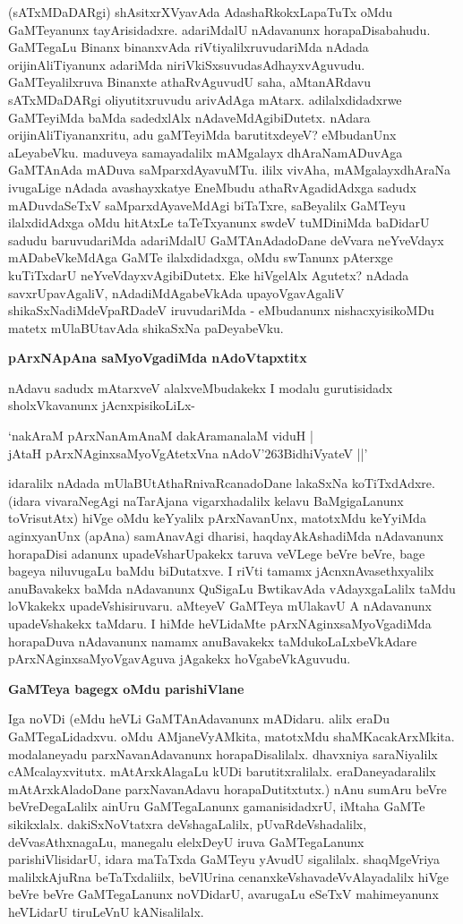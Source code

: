 (sATxMDaDARgi) shAsitxrXVyavAda AdashaRkokxLapaTuTx oMdu GaMTeyanunx tayArisidadxre. adariMdalU nAdavanunx horapaDisabahudu. GaMTegaLu Binanx binanxvAda riVtiyalilxruvudariMda nAdada orijinAliTiyanunx adariMda niriVkiSxsuvudasAdhayxvAguvudu. GaMTeyalilxruva Binanxte athaRvAguvudU saha, aMtanARdavu sATxMDaDARgi oliyutitxruvudu arivAdAga mAtarx. adilalxdidadxrwe GaMTeyiMda baMda sadedxlAlx nAdaveMdAgibiDutetx. nAdara orijinAliTiyananxritu, adu gaMTeyiMda barutitxdeyeV? eMbudanUnx aLeyabeVku. maduveya samayadalilx mAMgalayx dhAraNamADuvAga GaMTAnAda mADuva saMparxdAyavuMTu. ililx vivAha, mAMgalayxdhAraNa ivugaLige nAdada avashayxkatye EneMbudu athaRvAgadidAdxga sadudx mADuvdaSeTxV saMparxdAyaveMdAgi biTaTxre, saBeyalilx GaMTeyu ilalxdidAdxga oMdu hitAtxLe taTeTxyanunx swdeV tuMDiniMda baDidarU sadudu baruvudariMda adariMdalU GaMTAnAdadoDane deVvara neYveVdayx mADabeVkeMdAga GaMTe ilalxdidadxga, oMdu swTanunx pAterxge kuTiTxdarU neYveVdayxvAgibiDutetx. Eke hiVgelAlx Agutetx? nAdada savxrUpavAgaliV, nAdadiMdAgabeVkAda upayoVgavAgaliV shikaSxNadiMdeVpaRDadeV iruvudariMda - eMbudanunx nishacxyisikoMDu matetx mUlaBUtavAda shikaSxNa paDeyabeVku.

{\bf pArxNApAna saMyoVgadiMda nAdoVtapxtitx}

nAdavu sadudx mAtarxveV alalxveMbudakekx I modalu gurutisidadx sholxVkavanunx jAcnxpisikoLiLx-

\begin{shloka}
`nakAraM pArxNanAmAnaM dakAramanalaM viduH |\\
jAtaH pArxNAginxsaMyoVgAtetxVna nAdoV\char'263BidhiVyateV ||'
\end{shloka}

idaralilx nAdada mUlaBUtAthaRnivaRcanadoDane lakaSxNa koTiTxdAdxre. (idara vivaraNegAgi naTarAjana vigarxhadalilx kelavu BaMgigaLanunx toVrisutAtx) hiVge oMdu keYyalilx pArxNavanUnx, matotxMdu keYyiMda aginxyanUnx (apAna) samAnavAgi dharisi, haqdayAkAshadiMda nAdavanunx horapaDisi adanunx upadeVsharUpakekx taruva veVLege beVre beVre, bage bageya niluvugaLu baMdu biDutatxve. I riVti tamamx jAcnxnAvasethxyalilx anuBavakekx baMda nAdavanunx QuSigaLu BwtikavAda vAdayxgaLalilx taMdu loVkakekx upadeVshisiruvaru. aMteyeV GaMTeya mUlakavU A nAdavanunx upadeVshakekx taMdaru. I hiMde heVLidaMte pArxNAginxsaMyoVgadiMda horapaDuva nAdavanunx namamx anuBavakekx taMdukoLaLxbeVkAdare pArxNAginxsaMyoVgavAguva jAgakekx hoVgabeVkAguvudu.

{\bf GaMTeya bagegx oMdu parishiVlane}

Iga noVDi (eMdu heVLi GaMTAnAdavanunx mADidaru. alilx eraDu GaMTegaLidadxvu. oMdu AMjaneVyAMkita, matotxMdu shaMKacakArxMkita. modalaneyadu parxNavanAdavanunx horapaDisalilalx. dhavxniya saraNiyalilx cAMcalayxvitutx. mAtArxkAlagaLu kUDi barutitxralilalx. eraDaneyadaralilx mAtArxkAladoDane parxNavanAdavu horapaDutitxtutx.) nAnu sumAru beVre beVreDegaLalilx ainUru GaMTegaLanunx gamanisidadxrU, iMtaha GaMTe sikikxlalx. dakiSxNoVtatxra deVshagaLalilx, pUvaRdeVshadalilx, deVvasAthxnagaLu, manegalu elelxDeyU iruva GaMTegaLanunx parishiVlisidarU, idara maTaTxda GaMTeyu yAvudU sigalilalx. shaqMgeVriya malilxkAjuRna beTaTxdaliilx, beVlUrina cenanxkeVshavadeVvAlayadalilx hiVge beVre beVre GaMTegaLanunx noVDidarU, avarugaLu eSeTxV mahimeyanunx heVLidarU tiruLeVnU kANisalilalx.

